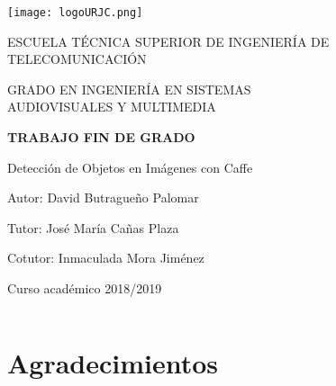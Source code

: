 \documentclass[a4paper, 12pt, spanish, chapterprefix, numbers=noenddot]{book}
\begin{document}
\begin{titlepage}
	\begin{center}
		\vspace*{3mm}
		\begin{center}
			\texttt{[image: logoURJC.png]}
		\end{center}
		\vspace{6.5mm}
		
		\fontsize{15.5}{14}\selectfont ESCUELA TÉCNICA SUPERIOR DE INGENIERÍA DE TELECOMUNICACIÓN
		\vspace{13mm}
		
		\fontsize{14}{14}\selectfont GRADO EN INGENIERÍA EN SISTEMAS \\ AUDIOVISUALES Y MULTIMEDIA
		
		\vspace{70pt}
		
		\fontsize{15.7}{14}\selectfont \textbf{TRABAJO FIN DE GRADO} 
		
		\vspace{25mm}
		\begin{huge}
			Detección de Objetos en Imágenes con Caffe
		\end{huge}
		
		\vspace{25mm}
		
		\begin{large}
			Autor: David Butragueño Palomar
			
			Tutor:  José María Cañas Plaza
			
			Cotutor: Inmaculada Mora Jiménez
			
			\vspace{10mm}
		\end{large}
		\begin{normalsize}
			Curso académico 2018/2019		
		\end{normalsize}
		\vspace{10mm}
		
	\end{center}
	
\end{titlepage}

\newpage
$\ $
\thispagestyle{empty} 

\chapter*{Agradecimientos} %
\end{document}
